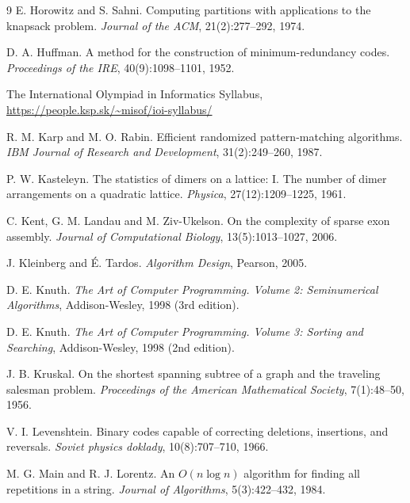 \begin{thebibliography}{9}
  E. Horowitz and S. Sahni.
  Computing partitions with applications to the knapsack problem.
  \emph{Journal of the ACM}, 21(2):277--292, 1974.

  D. A. Huffman.
  A method for the construction of minimum-redundancy codes.
  \emph{Proceedings of the IRE}, 40(9):1098--1101, 1952.

  The International Olympiad in Informatics Syllabus,
  \url{https://people.ksp.sk/~misof/ioi-syllabus/}

  R. M. Karp and M. O. Rabin.
  Efficient randomized pattern-matching algorithms.
  \emph{IBM Journal of Research and Development}, 31(2):249--260, 1987.

  P. W. Kasteleyn.  
  The statistics of dimers on a lattice: I. The number of dimer arrangements on a quadratic lattice.
  \emph{Physica}, 27(12):1209--1225, 1961.

  C. Kent, G. M. Landau and M. Ziv-Ukelson.
  On the complexity of sparse exon assembly.
  \emph{Journal of Computational Biology}, 13(5):1013--1027, 2006.

  J. Kleinberg and É. Tardos.
  \emph{Algorithm Design}, Pearson, 2005.

  D. E. Knuth.
  \emph{The Art of Computer Programming. Volume 2: Seminumerical Algorithms}, Addison-Wesley, 1998 (3rd edition).

  D. E. Knuth.
  \emph{The Art of Computer Programming. Volume 3: Sorting and Searching}, Addison-Wesley, 1998 (2nd edition).


  J. B. Kruskal.
  On the shortest spanning subtree of a graph and the traveling salesman problem.
  \emph{Proceedings of the American Mathematical Society}, 7(1):48--50, 1956.

  V. I. Levenshtein.
  Binary codes capable of correcting deletions, insertions, and reversals.
  \emph{Soviet physics doklady}, 10(8):707--710, 1966.

  M. G. Main and R. J. Lorentz.
  An $O(n \log n)$ algorithm for finding all repetitions in a string.
  \emph{Journal of Algorithms}, 5(3):422--432, 1984.



\end{thebibliography}
